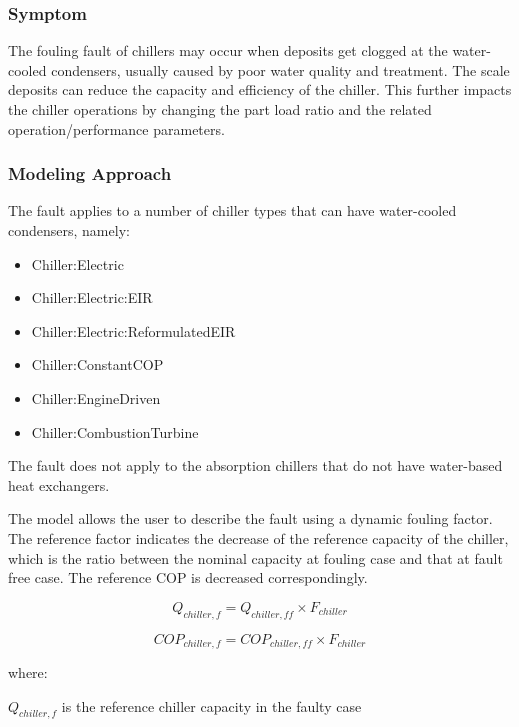 \subsubsection{Symptom}

The fouling fault of chillers may occur when deposits get clogged at the water-cooled condensers, usually caused by poor water quality and treatment. The scale deposits can reduce the capacity and efficiency of the chiller. This further impacts the chiller operations by changing the part load ratio and the related operation/performance parameters.

\subsubsection{Modeling Approach}

The fault applies to a number of chiller types that can have water-cooled condensers, namely:

\begin{itemize}
\tightlist
\item
  Chiller:Electric
\item
  Chiller:Electric:EIR
\item
  Chiller:Electric:ReformulatedEIR
\item
  Chiller:ConstantCOP
\item
  Chiller:EngineDriven
\item
  Chiller:CombustionTurbine
\end{itemize}

The fault does not apply to the absorption chillers that do not have water-based heat exchangers. 

The model allows the user to describe the fault using a dynamic fouling factor. The reference factor indicates the decrease of the reference capacity of the chiller, which is the ratio between the nominal capacity at fouling case and that at fault free case. The reference COP is decreased correspondingly.

\begin{equation}
Q_{chiller,f} = Q_{chiller,ff} \times F_{chiller}
\end{equation}

\begin{equation}
COP_{chiller,f} = COP_{chiller,ff} \times F_{chiller}
\end{equation}

where:

\(Q_{chiller,f}\) is the reference chiller capacity in the faulty case

